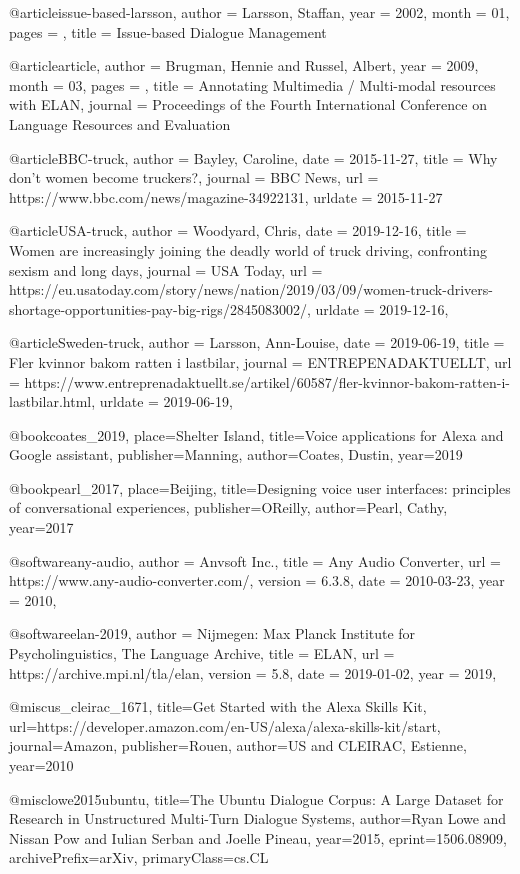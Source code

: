 @article{issue-based-larsson,
author = {Larsson, Staffan},
year = {2002},
month = {01},
pages = {},
title = {Issue-based Dialogue Management}
}


@article{article,
author = {Brugman, Hennie and Russel, Albert},
year = {2009},
month = {03},
pages = {},
title = {Annotating Multimedia / Multi-modal resources with ELAN},
journal = {Proceedings of the Fourth International Conference on Language Resources and Evaluation}
}

@article{BBC-truck,
 author  = {Bayley, Caroline},
 date    = {2015-11-27},
 title   = {Why don't women become truckers?},
 journal = {BBC News},
 url     = {https://www.bbc.com/news/magazine-34922131},
 urldate = {2015-11-27}
}

@article{USA-truck,
 author  = {Woodyard, Chris},
 date    = {2019-12-16},
 title   = {Women are increasingly joining the deadly world of truck driving, confronting sexism and long days},
 journal = {USA Today},
 url     = {https://eu.usatoday.com/story/news/nation/2019/03/09/women-truck-drivers-shortage-opportunities-pay-big-rigs/2845083002/},
 urldate = {2019-12-16},
}

@article{Sweden-truck,
 author  = {Larsson, Ann-Louise},
 date    = {2019-06-19},
 title   = {Fler kvinnor bakom ratten i lastbilar},
 journal = {ENTREPENADAKTUELLT},
 url     = {https://www.entreprenadaktuellt.se/artikel/60587/fler-kvinnor-bakom-ratten-i-lastbilar.html},
 urldate = {2019-06-19},
}

@book{coates_2019, 
place={Shelter Island}, 
title={Voice applications for Alexa and Google assistant}, 
publisher={Manning}, 
author={Coates, Dustin}, 
year={2019}
}

@book{pearl_2017, 
    place={Beijing}, 
    title={Designing voice user interfaces: principles of conversational experiences}, 
    publisher={OReilly}, 
    author={Pearl, Cathy}, 
    year={2017}
    } 



@software{any-audio,
  author = {{Anvsoft Inc.}},
  title = {Any Audio Converter},
  url = {https://www.any-audio-converter.com/},
  version = {6.3.8},
  date = {2010-03-23},
  year = {2010},
}

@software{elan-2019,
  author = {{Nijmegen: Max Planck Institute for Psycholinguistics, The Language Archive}},
  title = {ELAN},
  url = {https://archive.mpi.nl/tla/elan},
  version = {5.8},
  date = {2019-01-02},
  year = {2019},
}


@misc{us_cleirac_1671, 
title={Get Started with the Alexa Skills Kit}, 
url={https://developer.amazon.com/en-US/alexa/alexa-skills-kit/start}, 
journal={Amazon}, 
publisher={Rouen}, 
author={US and CLEIRAC, Estienne}, 
year={2010}} 

@misc{lowe2015ubuntu,
    title={The Ubuntu Dialogue Corpus: A Large Dataset for Research in Unstructured Multi-Turn Dialogue Systems},
    author={Ryan Lowe and Nissan Pow and Iulian Serban and Joelle Pineau},
    year={2015},
    eprint={1506.08909},
    archivePrefix={arXiv},
    primaryClass={cs.CL}
}